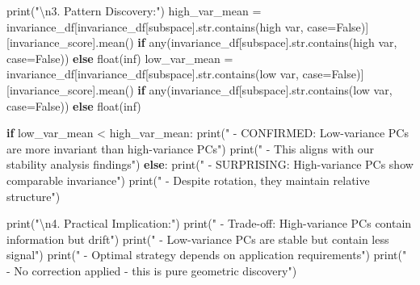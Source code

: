 \documentclass[
  letterpaper,
  DIV=11,
  numbers=noendperiod]{scrartcl}
\newenvironment{Shaded}{\begin{snugshade}}{\end{snugshade}}
\newcommand{\BuiltInTok}[1]{\textcolor[rgb]{0.00,0.23,0.31}{#1}}
\newcommand{\CharTok}[1]{\textcolor[rgb]{0.13,0.47,0.30}{#1}}
\newcommand{\ControlFlowTok}[1]{\textcolor[rgb]{0.00,0.23,0.31}{\textbf{#1}}}
\newcommand{\NormalTok}[1]{\textcolor[rgb]{0.00,0.23,0.31}{#1}}
\newcommand{\OperatorTok}[1]{\textcolor[rgb]{0.37,0.37,0.37}{#1}}
\newcommand{\StringTok}[1]{\textcolor[rgb]{0.13,0.47,0.30}{#1}}
\newcommand{\VariableTok}[1]{\textcolor[rgb]{0.07,0.07,0.07}{#1}}
\renewenvironment{Shaded}{%
  \begin{tcolorbox}[%
    enhanced,%
    colback=codebg,%
    colframe=codebg,%
    borderline west={3pt}{0pt}{sectionblue},%
    fontupper=\small\ttfamily,%
    boxrule=0pt,%
    arc=0pt,%
    boxsep=5pt,%
    left=2mm,%
    right=2mm,%
    top=2mm,%
    bottom=2mm%
  ]%
}{%
  \end{tcolorbox}%
}
\begin{document}
\begin{Shaded}
\begin{Highlighting}[]
\BuiltInTok{print}\NormalTok{(}\StringTok{"}\CharTok{\textbackslash{}n}\StringTok{3. Pattern Discovery:"}\NormalTok{)}
\NormalTok{high\_var\_mean }\OperatorTok{=}\NormalTok{ invariance\_df[invariance\_df[}\StringTok{\textquotesingle{}subspace\textquotesingle{}}\NormalTok{].}\BuiltInTok{str}\NormalTok{.contains(}\StringTok{\textquotesingle{}high var\textquotesingle{}}\NormalTok{, case}\OperatorTok{=}\VariableTok{False}\NormalTok{)][}\StringTok{\textquotesingle{}invariance\_score\textquotesingle{}}\NormalTok{].mean() }\ControlFlowTok{if} \BuiltInTok{any}\NormalTok{(invariance\_df[}\StringTok{\textquotesingle{}subspace\textquotesingle{}}\NormalTok{].}\BuiltInTok{str}\NormalTok{.contains(}\StringTok{\textquotesingle{}high var\textquotesingle{}}\NormalTok{, case}\OperatorTok{=}\VariableTok{False}\NormalTok{)) }\ControlFlowTok{else} \BuiltInTok{float}\NormalTok{(}\StringTok{\textquotesingle{}inf\textquotesingle{}}\NormalTok{)}
\NormalTok{low\_var\_mean }\OperatorTok{=}\NormalTok{ invariance\_df[invariance\_df[}\StringTok{\textquotesingle{}subspace\textquotesingle{}}\NormalTok{].}\BuiltInTok{str}\NormalTok{.contains(}\StringTok{\textquotesingle{}low var\textquotesingle{}}\NormalTok{, case}\OperatorTok{=}\VariableTok{False}\NormalTok{)][}\StringTok{\textquotesingle{}invariance\_score\textquotesingle{}}\NormalTok{].mean() }\ControlFlowTok{if} \BuiltInTok{any}\NormalTok{(invariance\_df[}\StringTok{\textquotesingle{}subspace\textquotesingle{}}\NormalTok{].}\BuiltInTok{str}\NormalTok{.contains(}\StringTok{\textquotesingle{}low var\textquotesingle{}}\NormalTok{, case}\OperatorTok{=}\VariableTok{False}\NormalTok{)) }\ControlFlowTok{else} \BuiltInTok{float}\NormalTok{(}\StringTok{\textquotesingle{}inf\textquotesingle{}}\NormalTok{)}

\ControlFlowTok{if}\NormalTok{ low\_var\_mean }\OperatorTok{\textless{}}\NormalTok{ high\_var\_mean:}
    \BuiltInTok{print}\NormalTok{(}\StringTok{"   {-} CONFIRMED: Low{-}variance PCs are more invariant than high{-}variance PCs"}\NormalTok{)}
    \BuiltInTok{print}\NormalTok{(}\StringTok{"   {-} This aligns with our stability analysis findings"}\NormalTok{)}
\ControlFlowTok{else}\NormalTok{:}
    \BuiltInTok{print}\NormalTok{(}\StringTok{"   {-} SURPRISING: High{-}variance PCs show comparable invariance"}\NormalTok{)}
    \BuiltInTok{print}\NormalTok{(}\StringTok{"   {-} Despite rotation, they maintain relative structure"}\NormalTok{)}

\BuiltInTok{print}\NormalTok{(}\StringTok{"}\CharTok{\textbackslash{}n}\StringTok{4. Practical Implication:"}\NormalTok{)}
\BuiltInTok{print}\NormalTok{(}\StringTok{"   {-} Trade{-}off: High{-}variance PCs contain information but drift"}\NormalTok{)}
\BuiltInTok{print}\NormalTok{(}\StringTok{"   {-} Low{-}variance PCs are stable but contain less signal"}\NormalTok{)}
\BuiltInTok{print}\NormalTok{(}\StringTok{"   {-} Optimal strategy depends on application requirements"}\NormalTok{)}
\BuiltInTok{print}\NormalTok{(}\StringTok{"   {-} No correction applied {-} this is pure geometric discovery"}\NormalTok{)}
\end{Highlighting}
\end{Shaded}
\end{document}
